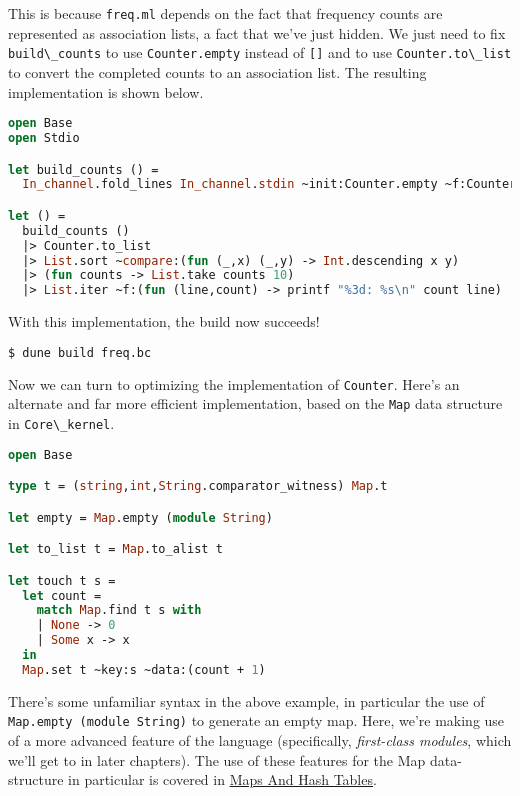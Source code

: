 This is because \passthrough{\lstinline!freq.ml!} depends on the fact
that frequency counts are represented as association lists, a fact that
we've just hidden. We just need to fix
\passthrough{\lstinline!build\_counts!} to use
\passthrough{\lstinline!Counter.empty!} instead of
\passthrough{\lstinline![]!} and to use
\passthrough{\lstinline!Counter.to\_list!} to convert the completed
counts to an association list. The resulting implementation is shown
below.

\begin{lstlisting}[language=Caml]
open Base
open Stdio

let build_counts () =
  In_channel.fold_lines In_channel.stdin ~init:Counter.empty ~f:Counter.touch

let () =
  build_counts ()
  |> Counter.to_list
  |> List.sort ~compare:(fun (_,x) (_,y) -> Int.descending x y)
  |> (fun counts -> List.take counts 10)
  |> List.iter ~f:(fun (line,count) -> printf "%3d: %s\n" count line)
\end{lstlisting}

With this implementation, the build now succeeds!

\begin{lstlisting}[language=bash]
$ dune build freq.bc
\end{lstlisting}

Now we can turn to optimizing the implementation of
\passthrough{\lstinline!Counter!}. Here's an alternate and far more
efficient implementation, based on the \passthrough{\lstinline!Map!}
data structure in \passthrough{\lstinline!Core\_kernel!}.

\begin{lstlisting}[language=Caml]
open Base

type t = (string,int,String.comparator_witness) Map.t

let empty = Map.empty (module String)

let to_list t = Map.to_alist t

let touch t s =
  let count =
    match Map.find t s with
    | None -> 0
    | Some x -> x
  in
  Map.set t ~key:s ~data:(count + 1)
\end{lstlisting}

There's some unfamiliar syntax in the above example, in particular the
use of \passthrough{\lstinline!Map.empty (module String)!} to generate
an empty map. Here, we're making use of a more advanced feature of the
language (specifically, \emph{first-class modules}, which we'll get to
in later chapters). The use of these features for the Map data-structure
in particular is covered in
\href{maps-and-hashtables.html\#maps-and-hash-tables}{Maps And Hash
Tables}.

